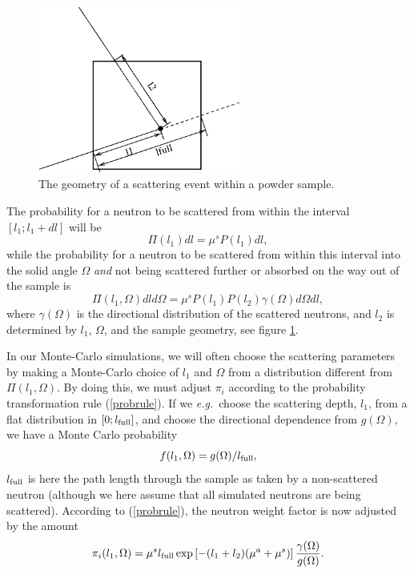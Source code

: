 \begin{figure}
  \begin{center}
    \includegraphics[width=0.6\textwidth]{figures/scatter.eps}
  \end{center}
\caption{The geometry of a scattering event within a powder sample.}
\label{powderFig}
\end{figure}

The probability for a neutron to be scattered from within the interval
$[ l_1 ; l_1+dl ]$ will be
\begin{equation}
\Pi(l_1) dl = \mu^s P(l_1) dl ,
\end{equation}
while the probability for a neutron to be scattered from within
this interval into the solid angle $\Omega$ {\em and}
not being scattered further
or absorbed on the way out of the sample is
\begin{equation}
\Pi(l_1,\Omega) dl d\Omega =
  \mu^s P(l_1) P(l_2) \gamma(\Omega) d\Omega dl ,
\end{equation}
where $\gamma(\Omega)$ is the directional distribution
of the scattered neutrons, and $l_2$ is determined by $l_1$,
$\Omega$, and the sample geometry, see figure \ref{powderFig}.

In our Monte-Carlo simulations, we will often choose the scattering
parameters by making a Monte-Carlo choice of $l_1$ and $\Omega$
from a distribution different from $\Pi(l_1,\Omega)$.
By doing this, we must adjust $\pi_i$ according to
the probability transformation rule (\ref{probrule}).
If we {\em e.g.}\ choose the scattering depth, $l_1$,
from a flat distribution in $[ 0 ; l_{\rm full} ]$,
and choose the directional dependence from $g(\Omega)$,
we have a Monte Carlo probability
\begin{equation}
f(l_1,\Omega) = g(\Omega) / l_{\rm full} ,
\end{equation}
$l_{\rm full}$ is here the path length through the sample
as taken by a non-scattered neutron (although we here
assume that all simulated neutrons are being scattered).
According to (\ref{probrule}), the neutron weight factor
is now adjusted by the amount
\begin{equation}     \label{sampleprob}
\pi_i(l_1,\Omega) =
 \mu^s l_{\rm full} \exp \left[ - (l_1+l_2) (\mu^a + \mu^s) \right]
  \frac{\gamma(\Omega)}{g(\Omega)} .
\end{equation}

